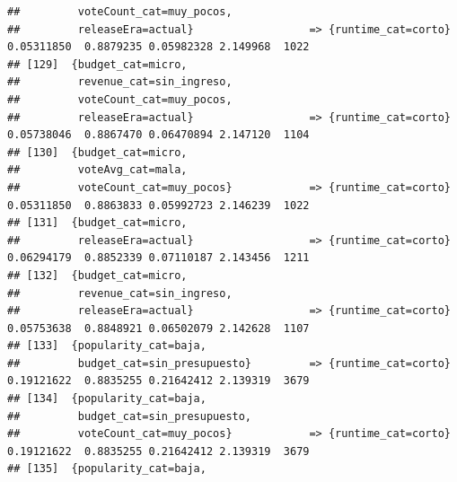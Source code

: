 \documentclass[
]{article}
\begin{document}
\begin{verbatim}
##         voteCount_cat=muy_pocos,                                                                                                
##         releaseEra=actual}                  => {runtime_cat=corto}               0.05311850  0.8879235 0.05982328 2.149968  1022
## [129]  {budget_cat=micro,                                                                                                       
##         revenue_cat=sin_ingreso,                                                                                                
##         voteCount_cat=muy_pocos,                                                                                                
##         releaseEra=actual}                  => {runtime_cat=corto}               0.05738046  0.8867470 0.06470894 2.147120  1104
## [130]  {budget_cat=micro,                                                                                                       
##         voteAvg_cat=mala,                                                                                                       
##         voteCount_cat=muy_pocos}            => {runtime_cat=corto}               0.05311850  0.8863833 0.05992723 2.146239  1022
## [131]  {budget_cat=micro,                                                                                                       
##         releaseEra=actual}                  => {runtime_cat=corto}               0.06294179  0.8852339 0.07110187 2.143456  1211
## [132]  {budget_cat=micro,                                                                                                       
##         revenue_cat=sin_ingreso,                                                                                                
##         releaseEra=actual}                  => {runtime_cat=corto}               0.05753638  0.8848921 0.06502079 2.142628  1107
## [133]  {popularity_cat=baja,                                                                                                    
##         budget_cat=sin_presupuesto}         => {runtime_cat=corto}               0.19121622  0.8835255 0.21642412 2.139319  3679
## [134]  {popularity_cat=baja,                                                                                                    
##         budget_cat=sin_presupuesto,                                                                                             
##         voteCount_cat=muy_pocos}            => {runtime_cat=corto}               0.19121622  0.8835255 0.21642412 2.139319  3679
## [135]  {popularity_cat=baja,                                                                                                    

\end{verbatim}
\end{document}

